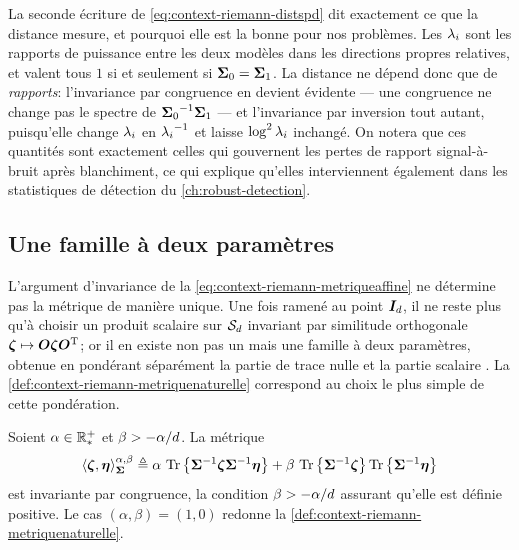 \begin{remark}
\label{rem:context-riemann-lecturedistance}
  La seconde écriture de \cref{eq:context-riemann-distspd} dit exactement ce que la distance mesure, et pourquoi elle est la bonne pour nos problèmes. Les $\lambda_i$ sont les rapports de puissance entre les deux modèles dans les directions propres relatives, et valent tous $1$ si et seulement si $\boldsymbol{\Sigma}_0=\boldsymbol{\Sigma}_1$. La distance ne dépend donc que de \emph{rapports}: l'invariance par congruence en devient évidente --- une congruence ne change pas le spectre de ${\boldsymbol{\Sigma}_0}^{-1}\boldsymbol{\Sigma}_1$ --- et l'invariance par inversion tout autant, puisqu'elle change $\lambda_i$ en ${\lambda_i}^{-1}$ et laisse $\log^2\lambda_i$ inchangé. On notera que ces quantités sont exactement celles qui gouvernent les pertes de rapport signal-à-bruit après blanchiment, ce qui explique qu'elles interviennent également dans les statistiques de détection du \cref{ch:robust-detection}.
\end{remark}

\subsection{Une famille à deux paramètres}
\label{subsec:context-riemann-famille}

L'argument d'invariance de la \cref{eq:context-riemann-metriqueaffine} ne détermine pas la métrique de manière unique. Une fois ramené au point $\boldsymbol{I}_{d}$, il ne reste plus qu'à choisir un produit scalaire sur $\mathcal{S}_{d}$ invariant par similitude orthogonale $\boldsymbol{\zeta}\mapsto\boldsymbol{O}\boldsymbol{\zeta}\boldsymbol{O}^{\mathrm{T}}$; or il en existe non pas un mais une famille à deux paramètres, obtenue en pondérant séparément la partie de trace nulle et la partie scalaire . La \cref{def:context-riemann-metriquenaturelle} correspond au choix le plus simple de cette pondération.

\begin{definition}
\label{def:context-riemann-affineinvariante}
  Soient $\alpha\in\mathbb{R}_*^+$ et $\beta>-\alpha/d$. La métrique
  \begin{equation}
    \left\langle \boldsymbol{\zeta}, \boldsymbol{\eta} \right\rangle_{\boldsymbol{\Sigma}}^{\alpha,\beta}
    \triangleq
    \alpha\,\operatorname{\operatorname{Tr}}\left\{{\boldsymbol{\Sigma}}^{-1}\boldsymbol{\zeta}{\boldsymbol{\Sigma}}^{-1}\boldsymbol{\eta}\right\}
    +
    \beta\,\operatorname{\operatorname{Tr}}\left\{{\boldsymbol{\Sigma}}^{-1}\boldsymbol{\zeta}\right\}\operatorname{\operatorname{Tr}}\left\{{\boldsymbol{\Sigma}}^{-1}\boldsymbol{\eta}\right\}
    \label{eq:context-riemann-metriqueaffineab}
  \end{equation}
  est invariante par congruence, la condition $\beta>-\alpha/d$ assurant qu'elle est définie positive. Le cas $(\alpha,\beta)=(1,0)$ redonne la \cref{def:context-riemann-metriquenaturelle}.
\end{definition}

